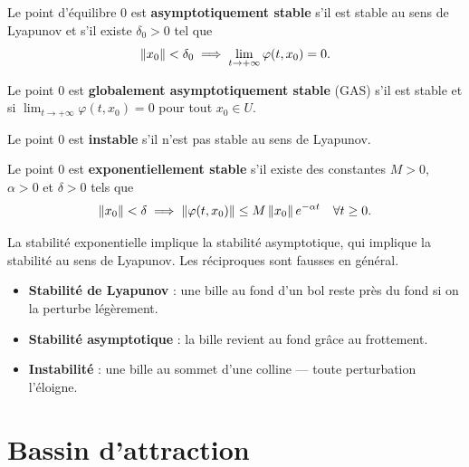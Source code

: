 \begin{definition}
Le point d'\'equilibre $0$ est \textbf{asymptotiquement stable} s'il est
stable au sens de Lyapunov et s'il existe $\delta_0 > 0$ tel que
\[
    \left\| x_0 \right\| < \delta_0 \implies \lim_{t \to +\infty} \varphi(t, x_0) = 0.
\]
\end{definition}

\begin{definition}
Le point $0$ est \textbf{globalement asymptotiquement stable} (GAS) s'il est
stable et si $\lim_{t \to +\infty} \varphi(t, x_0) = 0$ pour tout $x_0 \in U$.
\end{definition}

\begin{definition}[Instabilit\'e]
Le point $0$ est \textbf{instable} s'il n'est pas stable au sens de Lyapunov.
\end{definition}

\begin{definition}
Le point $0$ est \textbf{exponentiellement stable} s'il existe des constantes
$M > 0$, $\alpha > 0$ et $\delta > 0$ tels que
\[
    \left\| x_0 \right\| < \delta \implies \left\| \varphi(t, x_0) \right\| \leq M\left\| x_0 \right\|
    e^{-\alpha t} \quad \forall t \geq 0.
\]
\end{definition}

\begin{remarque}
La stabilit\'e exponentielle implique la stabilit\'e asymptotique, qui implique
la stabilit\'e au sens de Lyapunov. Les r\'eciproques sont fausses en g\'en\'eral.
\end{remarque}

\begin{intuition}
\begin{itemize}
    \item \textbf{Stabilit\'e de Lyapunov} : une bille au fond d'un bol reste
    pr\`es du fond si on la perturbe l\'eg\`erement.
    \item \textbf{Stabilit\'e asymptotique} : la bille revient au fond gr\^ace
    au frottement.
    \item \textbf{Instabilit\'e} : une bille au sommet d'une colline ---
    toute perturbation l'\'eloigne.
\end{itemize}
\end{intuition}

\section{Bassin d'attraction}

